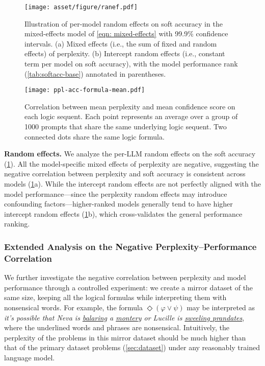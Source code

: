 \begin{figure}[t]
    \centering
    \vspace{-10pt}
    \texttt{[image: asset/figure/ranef.pdf]}
    \vspace{-15pt}
    \caption{
        \label{fig:random-effects}
        Illustration of per-model random effects on soft accuracy in the mixed-effects model of \cref{eqn: mixed-effects} with 99.9\% confidence intervals.
        (a) Mixed effects (i.e., the sum of fixed and random effects) of perplexity. (b) Intercept random effects (i.e., constant term per model on soft accuracy), with the model performance rank (\cref{tab:softacc-base}) annotated in parentheses.
    }
    \vspace{-10pt}
\end{figure}
\begin{figure*}[t]
    \centering
    \vspace{-5pt}
    \texttt{[image: ppl-acc-formula-mean.pdf]}
    \vspace{-15pt}
    \caption{
        \label{fig:corr}
        Correlation between mean perplexity and mean confidence score on each logic sequent.
        Each point represents an average over a group of 1000 prompts that share the same underlying logic sequent.
        Two connected dots share the same logic formula.
    }
    \vspace{-10pt}
\end{figure*}

\vspace{3pt}\noindent\textbf{Random effects.}
We analyze the per-LLM random effects on the soft accuracy (\cref{fig:random-effects}).
All the model-specific mixed effects of perplexity are negative, suggesting the negative correlation between perplexity and soft accuracy is consistent across models (\cref{fig:random-effects}a).
While the intercept random effects are not perfectly aligned with the model performance---since the perplexity random effects may introduce confounding factors---higher-ranked models generally tend to have higher intercept random effects (\cref{fig:random-effects}b), which cross-validates the general performance ranking.

\subsubsection{Extended Analysis on the Negative Perplexity--Performance Correlation}
\label{sec:perplexity}
We further investigate the negative correlation between perplexity and model performance through a controlled experiment: we create a mirror dataset of the same size, keeping all the logical formulas while interpreting them with nonsensical words.
For example, the formula $\Diamond(\varphi \lor \psi)$ may be interpreted as \textit{it's possible that Neva is \uline{balaring} a \uline{montery} or Lucille is \uline{sweeling prandates}}, where the underlined words and phrases are nonsensical.
Intuitively, the perplexity of the problems in this mirror dataset should be much higher than that of the primary dataset problems (\cref{sec:dataset}) under any reasonably trained language model.

